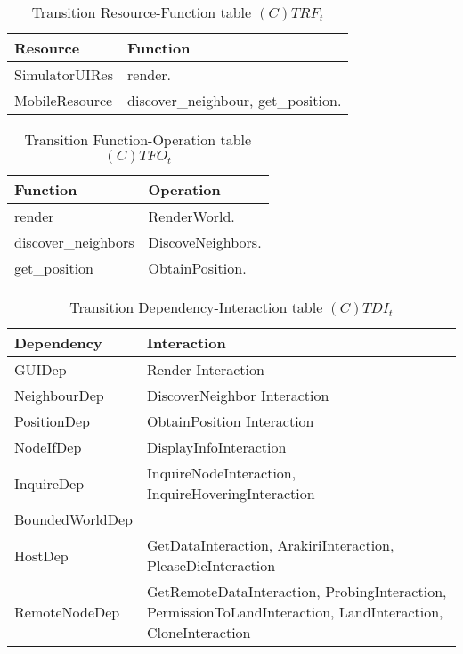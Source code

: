 \begin{table}[H]
	\centering
	\begin{tabular}{|p{4cm}|p{8cm}|}
			\hline
			\textbf{Resource} & \textbf{Function} \\
			\hline
			SimulatorUIRes & render. \\
			\hline
			MobileResource & discover\_neighbour, get\_position. \\
			\hline
		\end{tabular}
	\caption{Transition Resource-Function table $(C)TRF_t$}
	\label{tab:ctrft}
\end{table}

\begin{table}[H]
	\centering
	\begin{tabular}{|p{4cm}|p{8cm}|}
			\hline
			\textbf{Function} & \textbf{Operation} \\
			\hline
			render & RenderWorld. \\
			\hline
			discover\_neighbors & DiscoveNeighbors. \\
			\hline
			get\_position & ObtainPosition. \\
			\hline
		\end{tabular}
	\caption{Transition Function-Operation table $(C)TFO_t$}
	\label{tab:ctfot}
\end{table}

\begin{table}[H]
	\centering
	\begin{tabular}{|p{4cm}|p{8cm}|}
			\hline
			\textbf{Dependency} & \textbf{Interaction} \\
			\hline
			GUIDep & Render Interaction \\
			\hline
      NeighbourDep & DiscoverNeighbor Interaction \\
			\hline
      PositionDep &  ObtainPosition Interaction \\
			\hline
			NodeIfDep & DisplayInfoInteraction \\
			\hline
			InquireDep & InquireNodeInteraction, InquireHoveringInteraction\\
			\hline
			BoundedWorldDep & \\
			\hline
			HostDep & GetDataInteraction, ArakiriInteraction, PleaseDieInteraction \\
			\hline
			RemoteNodeDep & GetRemoteDataInteraction, ProbingInteraction, PermissionToLandInteraction, LandInteraction, CloneInteraction \\
			\hline
		\end{tabular}
	\caption{Transition Dependency-Interaction table $(C)TDI_t$}
	\label{tab:ctdit}
\end{table}

